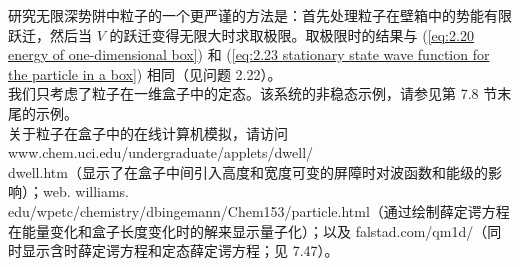 	\indent 研究无限深势阱中粒子的一个更严谨的方法是：首先处理粒子在壁箱中的势能有限跃迁，然后当 $V$ 的跃迁变得无限大时求取极限。取极限时的结果与 (\ref{eq:2.20 energy of one-dimensional box}) 和 (\ref{eq:2.23 stationary state wave function for the particle in a box}) 相同（见问题 2.22）。\\
	\indent 我们只考虑了粒子在一维盒子中的定态。该系统的非稳态示例，请参见第 7.8 节末尾的示例。\\
	\indent 关于粒子在盒子中的在线计算机模拟，请访问 www.chem.uci.edu/undergraduate/applets/dwell/\\dwell.htm（显示了在盒子中间引入高度和宽度可变的屏障时对波函数和能级的影响）；web. williams.\\edu/wpetc/chemistry/dbingemann/Chem153/particle.html（通过绘制薛定谔方程在能量变化和盒子长度变化时的解来显示量子化）；以及 falstad.com/qm1d/（同时显示含时薛定谔方程和定态薛定谔方程；见 7.47）。


